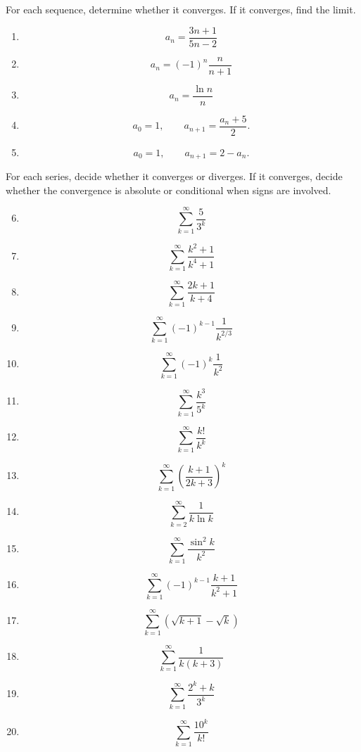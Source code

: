 For each sequence, determine whether it converges.  If it converges, find the limit.

\begin{enumerate}
\item
\[
a_n=\frac{3n+1}{5n-2}
\]

\item
\[
a_n=(-1)^n\frac{n}{n+1}
\]

\item
\[
a_n=\frac{\ln n}{n}
\]

\item
\[
a_0=1,
\qquad
a_{n+1}=\frac{a_n+5}{2}.
\]

\item
\[
a_0=1,
\qquad
a_{n+1}=2-a_n.
\]
\end{enumerate}

For each series, decide whether it converges or diverges.  If it converges, decide
whether the convergence is absolute or conditional when signs are involved.

\begin{enumerate}
\setcounter{enumi}{5}

\item
\[
\sum_{k=1}^{\infty}\frac{5}{3^k}
\]

\item
\[
\sum_{k=1}^{\infty}\frac{k^2+1}{k^4+1}
\]

\item
\[
\sum_{k=1}^{\infty}\frac{2k+1}{k+4}
\]

\item
\[
\sum_{k=1}^{\infty}(-1)^{k-1}\frac1{k^{2/3}}
\]

\item
\[
\sum_{k=1}^{\infty}(-1)^k\frac1{k^2}
\]

\item
\[
\sum_{k=1}^{\infty}\frac{k^3}{5^k}
\]

\item
\[
\sum_{k=1}^{\infty}\frac{k!}{k^k}
\]

\item
\[
\sum_{k=1}^{\infty}
\left(\frac{k+1}{2k+3}\right)^k
\]

\item
\[
\sum_{k=2}^{\infty}\frac1{k\ln k}
\]

\item
\[
\sum_{k=1}^{\infty}\frac{\sin^2 k}{k^2}
\]

\item
\[
\sum_{k=1}^{\infty}(-1)^{k-1}\frac{k+1}{k^2+1}
\]

\item
\[
\sum_{k=1}^{\infty}\left(\sqrt{k+1}-\sqrt{k}\right)
\]

\item
\[
\sum_{k=1}^{\infty}\frac1{k(k+3)}
\]

\item
\[
\sum_{k=1}^{\infty}\frac{2^k+k}{3^k}
\]

\item
\[
\sum_{k=1}^{\infty}\frac{10^k}{k!}
\]
\end{enumerate}

